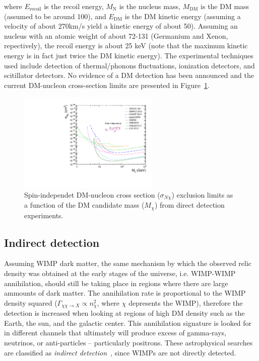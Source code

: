 where $E_{\mathrm{recoil}}$ is the recoil energy, $M_{\mathrm{N}}$ is
the nucleus mass, $M_{\mathrm{DM}}$ is the DM mass (assumed to be
around 100\GeV), and $E_{\mathrm{DM}}$ is the DM kinetic energy
(assuming a velocity of about 270\unit{km/s} yield a kinetic energy of
about 50\keV). Assuming an nucleus with an atomic weight of about
72-131 (Germanium and Xenon, repectively), the recoil energy is about
25 keV (note that the maximum kinetic energy is in fact just twice the
DM kinetic energy). The experimental techniques used include detection
of thermal/phonons fluctuations, ionization detectors, and scitillator
detectors. No evidence of a DM detection has been announced and
the current DM-nucleon cross-section limits are presented in
Figure~\ref{fig:dmLimits}. 
\begin{figure}
 \centering
\includegraphics[width=0.6\textwidth]{IntroFigures/SI_DM.pdf}
\caption{Spin-independet DM-nucleon cross section ($\sigma_{N\chi}$) exclusion limits
  as a function of the DM candidate mass ($M_{\chi}$) from direct detection experiments.\label{fig:dmLimits}}
\end{figure}
\subsection{Indirect detection}
Assuming WIMP dark matter, the same mechanism by which the observed
relic density was obtained at the early stages of the universe,
i.e. WIMP-WIMP annihilation, should still be taking place in regions
where there are large ammounts of dark matter. The annihilation
rate is proportional to the  WIMP density squared
($\Gamma_{\chi\chi\rightarrow X} \propto n^{2}_{\chi}$, where $\chi$
depresents the WIMP), therefore the detection is increased when
looking at regions of high DM density such as the Earth, the sun, and
the galactic center. This annihilation signature is looked for in
different channels that ultimately will produce excess of gamma-rays,
neutrinos, or anti-particles -- particularly positrons. These
astrophysical searches are classified as \textit{indirect
  detection}~\cite{IND1,IND2}, since WIMPs are not directly detected. 

